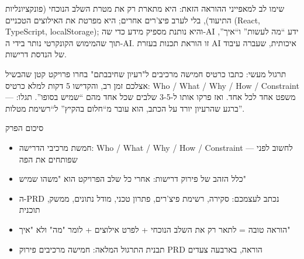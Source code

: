 שימו לב למאפייני ההוראה הזאת: היא מתארת רק את מטרת השלב הנוכחי (פונקציונליות התיעוד), בלי לערב פיצ'רים אחרים; היא מפרטת את האילוצים הטכניים (React, TypeScript, localStorage); והיא נותנת מספיק מידע כדי שה-AI ידע “מה לעשות” ו“איך”, תוך שהמימוש הקונקרטי נותר בידי ה-AI. זו הוראת תכנות בעזרת AI איכותית, שעברה עיבוד של הנדסת דרישות.

\begin{tcbpractice}{תרגול מעשי: כתבו כרטיס חמישה מרכיבים ל"רעיון שחיבבתם"}
בחרו פרויקט קטן שהבשיל אצלכם זמן רב, והקדישו 5 דקות למלא כרטיס: Who / What / Why / How / Constraint — משפט אחד לכל אחד. ואז פרקו אותו ל-3-5 שלבים שכל אחד מהם “שמיש בסופו”. תגלו: ברגע שהרעיון יורד על הכתב, הוא עובר מ“חלום בהקיץ” ל“רשימת מטלות”.

\end{tcbpractice}

\begin{tcbsummary}{סיכום הפרק}
\begin{itemize}
  \item חמשת מרכיבי הדרישה: Who / What / Why / How / Constraint — לחשוב לפני שפותחים את הפה
  \item כלל הזהב של פירוק דרישות: אחרי כל שלב הפרויקט הוא "משהו שמיש"
  \item ה-PRD נכתב לעצמכם: סקירה, רשימת פיצ'רים, פתרון טכני, מודל נתונים, ממשק, תוכנית
  \item הוראה טובה = לתאר רק את השלב הנוכחי + לפרט אילוצים + לומר "מה" ולא "איך"
  \item תבנית התרגול המלאה: חמישה מרכיבים פירוק PRD הוראה, בארבעה צעדים
\end{itemize}

\end{tcbsummary}
